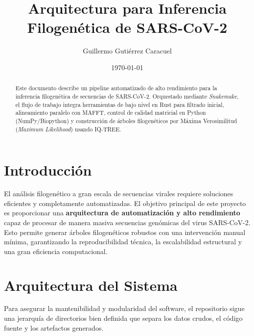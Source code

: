 \documentclass[11pt,a4paper]{article}
\title{\textbf{Arquitectura para Inferencia Filogenética de SARS-CoV-2}}
\author{Guillermo Gutiérrez Caracuel}
\date{\today}
\begin{document}
\maketitle
\thispagestyle{empty}

\begin{abstract}
    Este documento describe un pipeline automatizado de alto rendimiento para la inferencia filogenética de secuencias de SARS-CoV-2. Orquestado mediante \textit{Snakemake}, el flujo de trabajo integra herramientas de bajo nivel en Rust para filtrado inicial, alineamiento paralelo con MAFFT, control de calidad matricial en Python (NumPy/Biopython) y construcción de árboles filogenéticos por Máxima Verosimilitud (\textit{Maximum Likelihood}) usando IQ-TREE.
\end{abstract}

\vspace{0.5cm}

\section{Introducción}
El análisis filogenético a gran escala de secuencias virales requiere soluciones eficientes y completamente automatizadas. El objetivo principal de este proyecto es proporcionar una \textbf{arquitectura de automatización y alto rendimiento} capaz de procesar de manera masiva secuencias genómicas del virus SARS-CoV-2. Esto permite generar árboles filogenéticos robustos con una intervención manual mínima, garantizando la reproducibilidad técnica, la escalabilidad estructural y una gran eficiencia computacional.

\section{Arquitectura del Sistema}
Para asegurar la mantenibilidad y modularidad del software, el repositorio sigue una jerarquía de directorios bien definida que separa los datos crudos, el código fuente y los artefactos generados.

\vspace{0.5cm}
\vspace{0.5cm}
\end{document}
